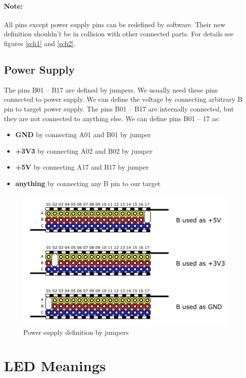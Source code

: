 \paragraph{Note:} All pins except power supply pins can be redefined by software. Their new definition shouldn't be in collision with other connected parts. For details see figures \ref{sch1} and \ref{sch2}.

\subsection{Power Supply}
\label{jumpersExternalPins}
The pins B01 -- B17 are defined by jumpers. We usually need these pins connected to power supply. We can define the voltage by connecting arbitrary B pin to target power supply. The pins B01 -- B17 are internally connected, but they are not connected to anything else. We can define pins B01 -- 17 as:
\begin{itemize}
	\item \textbf{GND} by connecting A01 and B01 by jumper
	\item \textbf{+3V3} by connecting A02 and B02 by jumper
	\item \textbf{+5V} by connecting A17 and B17 by jumper
	\item \textbf{anything} by connecting any B pin to our target
\end{itemize}

\begin{figure}[H]
	\centering
	\includegraphics[scale=1]{img/jumpers.pdf}
	\caption{Power supply definition by jumpers}
	\label{fig:jumpersSupply}
\end{figure}

\section{LED Meanings}

